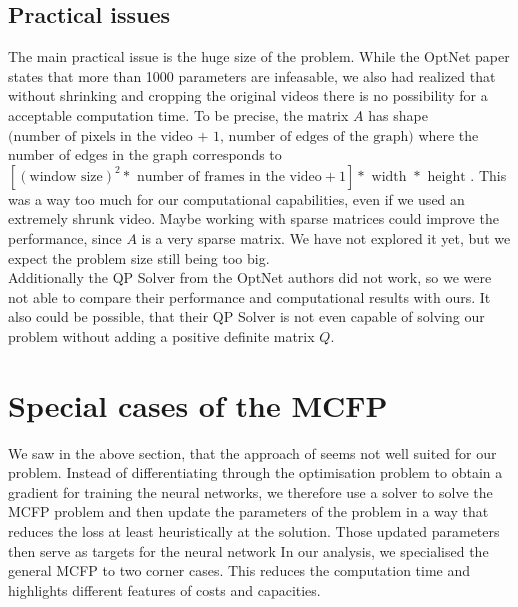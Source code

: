 \documentclass{article}
\begin{document}
\subsection{Practical issues}

The main practical issue is the huge size of the problem. While the OptNet paper states that more than 1000 parameters are infeasable, we also had realized that without shrinking and cropping the original videos there is no possibility for a acceptable computation time. To be precise, the matrix $A$ has shape $ \big(\text{number of pixels in the video + 1, number of edges of the graph}\big)$
where the number of edges in the graph corresponds to $[(\text{window size})^2  * \text{ number of frames in the video} + 1]* \text{ width } * \text{ height }.$ This was a way too much for our computational capabilities, even if we used an extremely shrunk video. 
Maybe working with sparse matrices could improve the performance, since $A$ is a very sparse matrix. We have not explored it yet, but we expect the problem size still being too big.\\
Additionally the QP Solver from the OptNet authors did not work, so we were not able to compare their performance and computational results with ours. It also could be possible, that their QP Solver is not even capable of solving our problem without adding a positive definite matrix $Q$.

\section{Special cases of the MCFP}
We saw in the above section, that the approach of \cite{AmosK17} seems not well suited for our problem. Instead of differentiating through the optimisation problem to obtain a gradient for training the neural networks, we therefore use a solver to solve the MCFP problem and then update the parameters of the problem in a way that reduces the loss at least heuristically at the solution. Those updated parameters then serve as targets for the neural network In our analysis, we specialised the general MCFP to two corner cases. This reduces the computation time and highlights different features of costs and capacities.
\end{document}

